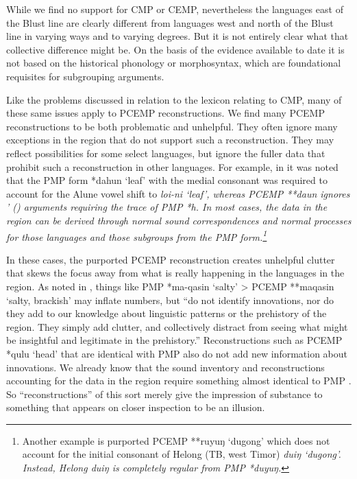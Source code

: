 While we find no support for CMP or CEMP,
nevertheless the languages east of the Blust line are clearly
different from languages west
and north of the Blust line in varying ways
and to varying degrees.
But it is not entirely clear what that collective difference might be.
On the basis of the evidence available to date it is not based
on the historical phonology or morphosyntax,
which are foundational requisites for subgrouping arguments.

Like the problems discussed in relation to the lexicon relating
to CMP, many of these same issues apply to PCEMP reconstructions.
We find many PCEMP reconstructions to be both problematic and unhelpful.
They often ignore many exceptions in the region that do not support such a reconstruction.
They may reflect possibilities for some select languages,
but ignore the fuller data that prohibit such a reconstruction in other languages.
For example, in  it was noted that the PMP form *dahun
‘leaf’ with the medial consonant was required to account for
the Alune vowel shift to \it{loi-ni} ‘leaf’,
whereas PCEMP **daun ignores \citeauthor{Collins1983}' (\citeyear[40--52]{Collins1983}) arguments
requiring the trace of PMP *h.
In most cases, the data in the region can be derived through
normal sound correspondences and normal processes for those languages
and those subgroups from the PMP form.\footnote{
		Another example is purported PCEMP **ruyuŋ `dugong'
		which does not account for the initial consonant
		of Helong (TB, west Timor) \it{duiŋ} `dugong'.
		Instead, Helong \it{duiŋ}
		is completely regular from PMP *duyuŋ.}

In these cases, the purported PCEMP reconstruction creates unhelpful
clutter that skews the focus away from what is really happening
in the languages in the region.
As noted in \citet{GrimesCIP},
things like PMP *ma-qasin ‘salty’ > PCEMP **maqasin ‘salty,
brackish’ may inflate numbers,
but “do not identify innovations,
nor do they add to our knowledge about linguistic patterns or
the prehistory of the region.
They simply add clutter,
and collectively distract from seeing what might be insightful
and legitimate in the prehistory.” Reconstructions such as PCEMP
*qulu ‘head’ that are identical with PMP also do not add new information about innovations.
We already know that the sound inventory
and reconstructions accounting for the data in the region require
something almost identical to PMP \citep{Grimes1991a}.
So “reconstructions” of this sort merely give the impression
of substance to something that appears on closer inspection to be an illusion.

